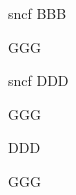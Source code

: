 \documentclass[12pt]{book}
\begin{document}
\begin{pages}
\begin{Leftside}
\beginnumbering
\pstart
sncf
\pend
\ledheads
{}
\eledheads
BBB
\pend

\pstart
{}

GGG
\pend
\endnumbering
\end{Leftside}

\begin{Rightside}
\beginnumbering
\pstart
sncf
\pend
\ledheads
{}
\eledheads
DDD
\pend
\pstart
{}

GGG
\pend
\endnumbering
\end{Rightside}
\Pages
\end{pages}

\beginnumbering
\ledheads
{}
\eledheads
DDD
\pend
\pstart
{}

GGG
\pend
\endnumbering
\end{document}
